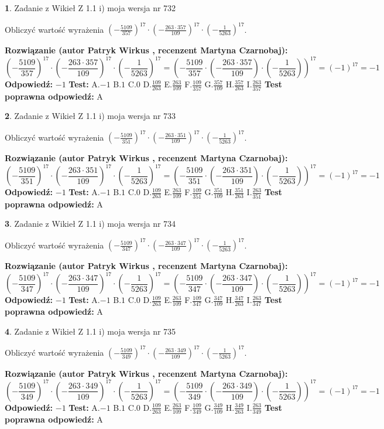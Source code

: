 \documentclass[12pt, a4paper]{article}
\theoremstyle{definition} %
\newtheorem{zad}{}
\newcommand{\zadStart}[1]{\begin{zad}#1\newline}
\newcommand{\zadStop}{\end{zad}}
\newcommand{\rozwStart}[2]{\noindent \textbf{Rozwiązanie (autor #1 , recenzent #2): }\newline}
\newcommand{\rozwStop}{\newline}
\newcommand{\odpStart}{\noindent \textbf{Odpowiedź:}\newline}
\newcommand{\odpStop}{\newline}
\newcommand{\testStart}{\noindent \textbf{Test:}\newline}
\newcommand{\testStop}{\newline}
\newcommand{\kluczStart}{\noindent \textbf{Test poprawna odpowiedź:}\newline}
\newcommand{\kluczStop}{\newline}
\begin{document}
\zadStart{Zadanie z Wikieł Z 1.1 i) moja wersja nr 732}

Obliczyć wartość wyrażenia $(-\frac{5109}{357})^{17} \cdot (-\frac{263 \cdot 357}{109})^{17} \cdot (-\frac{1}{5263})^{17}$.
\zadStop
\rozwStart{Patryk Wirkus}{Martyna Czarnobaj}
$$(-\frac{5109}{357})^{17} \cdot (-\frac{263 \cdot 357}{109})^{17} \cdot (-\frac{1}{5263})^{17} = (-\frac{5109}{357} \cdot (-\frac{263 \cdot 357}{109}) \cdot (-\frac{1}{5263}))^{17} = (-1)^{17} = -1$$
\rozwStop
\odpStart
$-1$
\odpStop
\testStart
A.$-1$ B.$1$ C.$0$ D.$\frac{109}{263}$ E.$\frac{263}{109}$
F.$\frac{109}{357}$ G.$\frac{357}{109}$
H.$\frac{357}{263}$
I.$\frac{263}{357}$
\testStop
\kluczStart
A
\kluczStop



\zadStart{Zadanie z Wikieł Z 1.1 i) moja wersja nr 733}

Obliczyć wartość wyrażenia $(-\frac{5109}{351})^{17} \cdot (-\frac{263 \cdot 351}{109})^{17} \cdot (-\frac{1}{5263})^{17}$.
\zadStop
\rozwStart{Patryk Wirkus}{Martyna Czarnobaj}
$$(-\frac{5109}{351})^{17} \cdot (-\frac{263 \cdot 351}{109})^{17} \cdot (-\frac{1}{5263})^{17} = (-\frac{5109}{351} \cdot (-\frac{263 \cdot 351}{109}) \cdot (-\frac{1}{5263}))^{17} = (-1)^{17} = -1$$
\rozwStop
\odpStart
$-1$
\odpStop
\testStart
A.$-1$ B.$1$ C.$0$ D.$\frac{109}{263}$ E.$\frac{263}{109}$
F.$\frac{109}{351}$ G.$\frac{351}{109}$
H.$\frac{351}{263}$
I.$\frac{263}{351}$
\testStop
\kluczStart
A
\kluczStop



\zadStart{Zadanie z Wikieł Z 1.1 i) moja wersja nr 734}

Obliczyć wartość wyrażenia $(-\frac{5109}{347})^{17} \cdot (-\frac{263 \cdot 347}{109})^{17} \cdot (-\frac{1}{5263})^{17}$.
\zadStop
\rozwStart{Patryk Wirkus}{Martyna Czarnobaj}
$$(-\frac{5109}{347})^{17} \cdot (-\frac{263 \cdot 347}{109})^{17} \cdot (-\frac{1}{5263})^{17} = (-\frac{5109}{347} \cdot (-\frac{263 \cdot 347}{109}) \cdot (-\frac{1}{5263}))^{17} = (-1)^{17} = -1$$
\rozwStop
\odpStart
$-1$
\odpStop
\testStart
A.$-1$ B.$1$ C.$0$ D.$\frac{109}{263}$ E.$\frac{263}{109}$
F.$\frac{109}{347}$ G.$\frac{347}{109}$
H.$\frac{347}{263}$
I.$\frac{263}{347}$
\testStop
\kluczStart
A
\kluczStop



\zadStart{Zadanie z Wikieł Z 1.1 i) moja wersja nr 735}

Obliczyć wartość wyrażenia $(-\frac{5109}{349})^{17} \cdot (-\frac{263 \cdot 349}{109})^{17} \cdot (-\frac{1}{5263})^{17}$.
\zadStop
\rozwStart{Patryk Wirkus}{Martyna Czarnobaj}
$$(-\frac{5109}{349})^{17} \cdot (-\frac{263 \cdot 349}{109})^{17} \cdot (-\frac{1}{5263})^{17} = (-\frac{5109}{349} \cdot (-\frac{263 \cdot 349}{109}) \cdot (-\frac{1}{5263}))^{17} = (-1)^{17} = -1$$
\rozwStop
\odpStart
$-1$
\odpStop
\testStart
A.$-1$ B.$1$ C.$0$ D.$\frac{109}{263}$ E.$\frac{263}{109}$
F.$\frac{109}{349}$ G.$\frac{349}{109}$
H.$\frac{349}{263}$
I.$\frac{263}{349}$
\testStop
\kluczStart
A
\kluczStop
\end{document}
